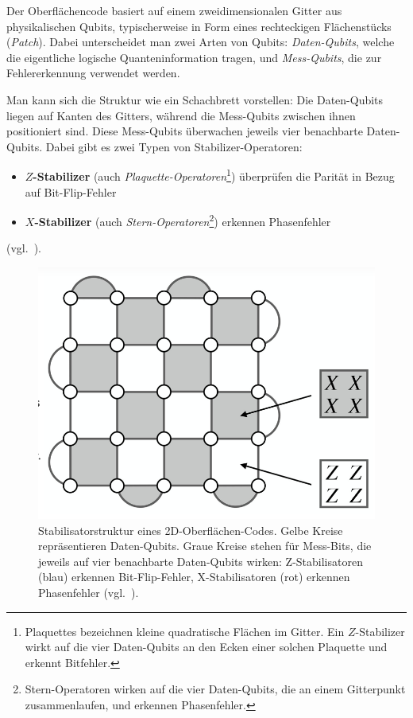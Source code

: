 Der Oberflächencode basiert auf einem zweidimensionalen Gitter aus physikalischen Qubits, typischerweise in Form eines rechteckigen Flächenstücks (\emph{Patch}). Dabei unterscheidet man zwei Arten von Qubits: \emph{Daten-Qubits}, welche die eigentliche logische Quanteninformation tragen, und \emph{Mess-Qubits}, die zur Fehlererkennung verwendet werden.

Man kann sich die Struktur wie ein Schachbrett vorstellen: Die Daten-Qubits liegen auf Kanten des Gitters, während die Mess-Qubits zwischen ihnen positioniert sind. Diese Mess-Qubits überwachen jeweils vier benachbarte Daten-Qubits. Dabei gibt es zwei Typen von Stabilizer-Operatoren:
\begin{itemize}
  \item \textbf{\(Z\)-Stabilizer} (auch \emph{Plaquette-Operatoren}\footnote{Plaquettes bezeichnen kleine quadratische Flächen im Gitter. Ein \(Z\)-Stabilizer wirkt auf die vier Daten-Qubits an den Ecken einer solchen Plaquette und erkennt Bitfehler.}) überprüfen die Parität in Bezug auf Bit-Flip-Fehler
  \item \textbf{\(X\)-Stabilizer} (auch \emph{Stern-Operatoren}\footnote{Stern-Operatoren wirken auf die vier Daten-Qubits, die an einem Gitterpunkt zusammenlaufen, und erkennen Phasenfehler.}) erkennen Phasenfehler
\end{itemize} (vgl.~\cite[676-679]{google_quantum_ai_suppressing_2023}).

\begin{figure}[htbp]
    \centering
    \includegraphics[width=0.6\linewidth]{images/error-correction/Abb4_Oberflaechencode_1.png}
    \caption{Stabilisatorstruktur eines 2D-Oberflächen-Codes. Gelbe Kreise repräsentieren Daten-Qubits. Graue Kreise stehen für Mess-Bits, die jeweils auf vier benachbarte Daten-Qubits wirken: Z-Stabilisatoren (blau) erkennen Bit-Flip-Fehler, X-Stabilisatoren (rot) erkennen Phasenfehler (vgl.~\cite{higgott_improved_2023}).}
    \label{fig:oberflaechencode-stabilisatoren}
\end{figure}

